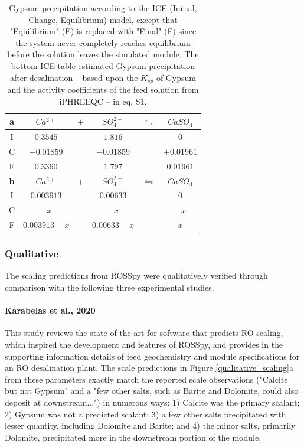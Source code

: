 \begin{table}
    \centering
    \begin{tabular}{c|ccccc}
      \toprule
      \textbf{a} & $Ca^{2+}$ & $+$ & $SO_4^{2-}$ & $\leftrightharpoons$ & $CaSO_4$ \\
      \midrule
      I & $0.3545$ && $1.816$ && $0$ \\
      C & $-0.01859$ && $-0.01859$ && $+0.01961$ \\
      F & $0.3360$ && $1.797$ && $0.01961$ \\
      \bottomrule
      
      \toprule
      \textbf{b} & $Ca^{2+}$ & $+$ & $SO_4^{2-}$ & $\leftrightharpoons$ & $CaSO_4$ \\
      \midrule
      I & $0.003913$ && $0.00633$ && $0$ \\
      C & $-x$ && $-x$ && $+x$ \\
      F & $0.003913-x$ && $0.00633-x$ && $x$ \\
      \bottomrule
    \end{tabular}
    \caption{
        Gypsum precipitation according to the ICE (Initial, Change, Equilibrium) model, except that "Equilibrium" (E) is replaced with "Final" (F) since the system never completely reaches equilibrium before the solution leaves the simulated module. The bottom ICE table estimated Gypsum precipitation after desalination -- based upon the $K_{sp}$ of Gypsum and the activity coefficients of the feed solution from iPHREEQC -- in eq. S1. 
      }
    \label{gypsum_ice_table}
\end{table}

\subsubsection{Qualitative}
The scaling predictions from ROSSpy were qualitatively verified through comparison with the following three experimental studies. 

\paragraph{Karabelas et al., 2020 \cite{Karabelas2020ScalingTools}}
This study reviews the state-of-the-art for software that predicts RO scaling, which inspired the development and features of ROSSpy, and provides in the supporting information details of feed geochemistry and module specifications for an RO desalination plant. The scale predictions in Figure \ref{qualitative_scaling}a from these parameters exactly match the reported scale observations ("Calcite but not Gypsum" and a "few other salts, such as Barite and Dolomite, could also deposit at downstream...") in numerous ways: 1) Calcite was the primary scalant; 2) Gypsum was not a predicted scalant; 3) a few other salts precipitated with lesser quantity, including Dolomite and Barite; and 4) the minor salts, primarily Dolomite, precipitated more in the downstream portion of the module.  

